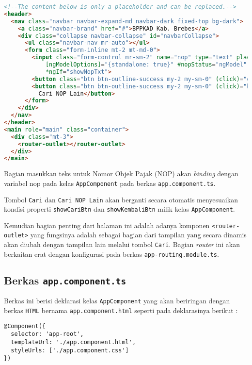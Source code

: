 \documentclass[pdftex,12pt, oneside]{article}
\begin{document}
\begin{lstlisting}[language=html]
<!--The content below is only a placeholder and can be replaced.-->
<header>
  <nav class="navbar navbar-expand-md navbar-dark fixed-top bg-dark">
    <a class="navbar-brand" href="#">BPPKAD Kab. Brebes</a>
    <div class="collapse navbar-collapse" id="navbarCollapse">
      <ul class="navbar-nav mr-auto"></ul>
      <form class="form-inline mt-2 mt-md-0">
        <input class="form-control mr-sm-2" name="nop" type="text" placeholder="NOP" aria-label="NOP" [(ngModel)]="nop"
            [ngModelOptions]="{standalone: true}" #nopStatus="ngModel"
            *ngIf="showNopTxt">
        <button class="btn btn-outline-success my-2 my-sm-0" (click)="cekNop(nop)" *ngIf="showCariBtn">Cari</button>
        <button class="btn btn-outline-success my-2 my-sm-0" (click)="kembali()" *ngIf="showKembaliBtn">
          Cari NOP Lain</button>
      </form>
    </div>
  </nav>
</header>
<main role="main" class="container">
  <div class="mt-3">
    <router-outlet></router-outlet>
  </div>
</main>
\end{lstlisting}

Bagian masukkan teks untuk Nomor Objek Pajak (NOP) akan \textit{binding} dengan variabel nop pada kelas \texttt{AppComponent} pada berkas \texttt{app.component.ts}.

Tombol \texttt{Cari} dan \texttt{Cari NOP Lain} akan berganti secara otomatis menyesuaikan kondisi properti \texttt{showCariBtn} dan \texttt{showKembaliBtn} milik kelas \texttt{AppComponent}.

Kemudian bagian penting dari halaman ini adalah adanya komponen \texttt{<router-outlet>} yang fungsinya adalah sebagai bagian dari tampilan yang secara dinamis akan diubah dengan tampilan lain melalui tombol \texttt{Cari}. Bagian \textit{router} ini akan berkaitan erat dengan konfigurasi pada berkas \texttt{app-routing.module.ts}.

\subsection{Berkas \texttt{app.component.ts}}

Berkas ini berisi deklarasi kelas \texttt{AppComponent} yang akan beriringan dengan berkas \texttt{HTML} bernama \texttt{app.component.html} seperti pada deklarasinya berikut :

\begin{lstlisting}
@Component({
  selector: 'app-root',
  templateUrl: './app.component.html',
  styleUrls: ['./app.component.css']
})
\end{lstlisting}
\end{document}
